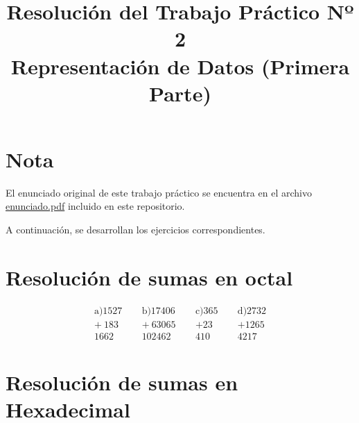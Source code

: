 \documentclass[12pt]{article}
\title{Resolución del Trabajo Práctico Nº 2\\\large Representación de Datos (Primera Parte)}
\date{\date{Mayo 2025}}
\begin{document}
\maketitle
\section*{Nota}

El enunciado original de este trabajo práctico se encuentra en el archivo \href{./enunciado.pdf}{enunciado.pdf} incluido en este repositorio.

\vspace{0.5cm}

A continuación, se desarrollan los ejercicios correspondientes.


\section{Resolución de sumas en octal}

\[
\begin{array}{r}
\text{a)}
  1527 \\
+ \ 183 \\
\hline
  1662
\end{array}
\quad\
\begin{array}{r}
\text{b)}
  17406 \\
+ \ 63065 \\
\hline
  102462
\end{array}
\quad\
\begin{array}{r}
\text{c)}
  365 \\
+ 23 \\
\hline
  410
\end{array}
\quad\
\begin{array}{r}
    \text{d)}
  2732 \\
+ 1265 \\
\hline
  4217
\end{array}
\]

\section{Resolución de sumas en Hexadecimal}
\end{document}
